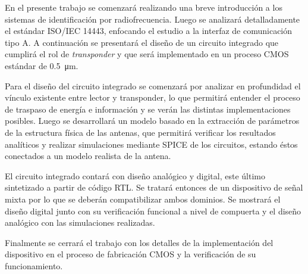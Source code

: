 \newenvironment{abstract}{
	\cleardoublepage \null \vfill 
	\begin{center}
		\bfseries 
		\abstractname 
	\end {center}
}%
{\vfill \null}


\begin{abstract}

En el presente trabajo se comenzará realizando una breve introducción 
a los sistemas de identificación por radiofrecuencia. Luego se 
analizará detalladamente el estándar ISO/IEC 14443, enfocando el 
estudio a la interfaz de comunicación tipo A. A continuación se 
presentará el diseño de un circuito integrado que cumplirá el rol de 
\emph{transponder} y que será implementado en un proceso CMOS 
estándar de \SI{0.5}{\micro\meter}.

Para el diseño del circuito integrado se comenzará por analizar en 
profundidad el vínculo existente entre lector y transponder, lo que 
permitirá entender el proceso de traspaso de energía e información y 
se verán las distintas implementaciones posibles. Luego se 
desarrollará un modelo basado en la extracción de parámetros de la 
estructura física de las antenas, que permitirá verificar los 
resultados analíticos y realizar simulaciones mediante SPICE de 
los circuitos, estando éstos conectados a un modelo realista de la 
antena.

El circuito integrado contará con diseño analógico y digital, este 
último sintetizado a partir de código RTL. Se tratará entonces de un 
dispositivo de señal mixta por lo que se deberán compatibilizar ambos 
dominios. Se mostrará el diseño digital junto con su verificación 
funcional a nivel de compuerta y el diseño analógico con las 
simulaciones realizadas.

Finalmente se cerrará el trabajo con los detalles de la 
implementación del dispositivo en el proceso de fabricación CMOS y la 
verificación de su funcionamiento.

\end{abstract}

